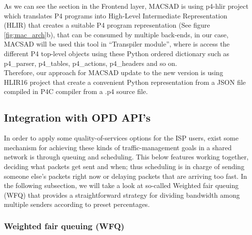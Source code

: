 As we can see the section 
in the Frontend layer, MACSAD is using p4-hlir project which translates P4 programs into High-Level Intermediate Representation (HLIR) that creates a suitable P4 program representation (See figure \ref{fig:mac_arch}b), that can be consumed by multiple back-ends, in our case, MACSAD will be used this tool in “Transpiler module”, where is access the different P4 top-level objects using these Python ordered dictionary such as p4\_parser, p4\_tables, p4\_actions, p4\_headers and so on.\\
Therefore, our approach for MACSAD update to the new version is using HLIR16 project 
that create a convenient Python representation from a JSON file compiled in P4C compiler from a .p4 source file. 


\subsection{Integration with OPD API's}

In order to apply some quality-of-services options for the ISP users, exist some mechanism for achieving these kinds of traffic-management goals in a shared network is through queuing and scheduling. This below features working together, deciding what packets get sent and when; thus scheduling is in charge of sending someone else’s packets right now or delaying packets that are arriving too fast.
In the following subsection, we will take a look at so-called Weighted fair queuing (WFQ) that provides a straightforward strategy for dividing bandwidth among multiple senders according to preset percentages.


\subsubsection{Weighted fair queuing (WFQ)} 






